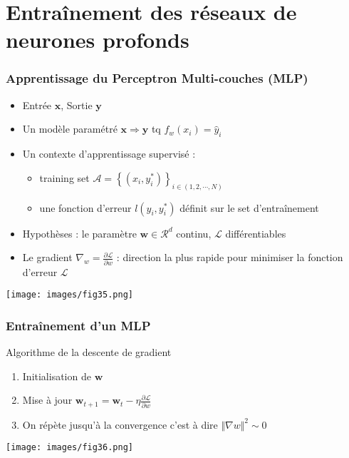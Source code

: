 \documentclass[9pt]{beamer}
\newcommand \ve[1]{\mathbf{#1}}
\begin{document}
\section{Entraînement des réseaux de neurones profonds}
\begin{frame}
\frametitle{Apprentissage du Perceptron Multi-couches (MLP)}
\begin{alertblock}{}
\begin{itemize}
\item Entrée $\ve{x}$, Sortie $\ve{y}$
\item Un modèle paramétré $\ve{x} \Rightarrow \ve{y}$ tq $f_w(x_i)=\hat{y}_i$
\item Un contexte d'apprentissage supervisé :
\begin{itemize}
\item  training set $\mathcal{A} = \left\lbrace (x_i, y_i^*)\right\rbrace_{ i \in (1,2, \cdots ,N)}$
\item une fonction d'erreur $l(\hat{y}_i, y_i^*)$ définit sur le set d'entraînement
\end{itemize}
\item Hypothèses : le paramètre $\ve{w} \in \mathcal{R}^d$ continu, $\mathcal{L}$ différentiables
\item Le gradient $\nabla_w = \frac{\partial \mathcal{L}}{\partial w}$ : direction la plus rapide pour minimiser la fonction d'erreur $\mathcal{L}$
\end{itemize}
\end{alertblock}

\begin{center}
\texttt{[image: images/fig35.png]}
\end{center}
\end{frame}

\begin{frame}
\frametitle{Entraînement d'un MLP}
\begin{block}{Algorithme de la descente de gradient}
\begin{enumerate}
\item Initialisation de $\ve{w}$
\item Mise à jour $\ve{w}_{t+1}=\ve{w}_t-\eta \frac{\partial \mathcal{L}}{\partial w}$
\item On répète jusqu'à la convergence c'est à dire $\Vert \nabla w\Vert^2 \sim 0$
\end{enumerate}
\end{block}

\begin{center}
\texttt{[image: images/fig36.png]}
\end{center}
\end{frame}
\end{document}
